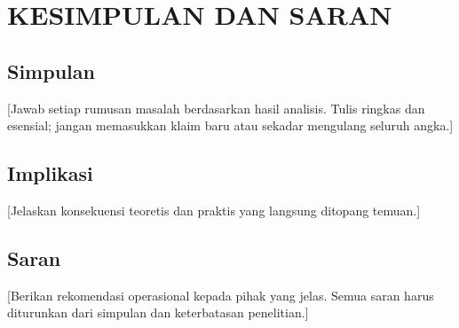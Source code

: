 \chapter{KESIMPULAN DAN SARAN}

\section{Simpulan}

[Jawab setiap rumusan masalah berdasarkan hasil analisis. Tulis ringkas dan
esensial; jangan memasukkan klaim baru atau sekadar mengulang seluruh angka.]

\section{Implikasi}

[Jelaskan konsekuensi teoretis dan praktis yang langsung ditopang temuan.]

\section{Saran}

[Berikan rekomendasi operasional kepada pihak yang jelas. Semua saran harus
diturunkan dari simpulan dan keterbatasan penelitian.]

